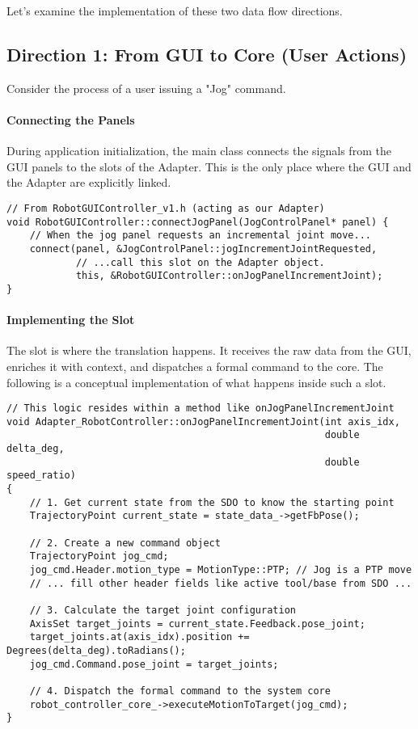 Let's examine the implementation of these two data flow directions.

\subsection{Direction 1: From GUI to Core (User Actions)}
\label{subsec:gui_to_core}

Consider the process of a user issuing a "Jog" command.

\paragraph{Connecting the Panels}
During application initialization, the main class connects the signals from the GUI panels to the slots of the Adapter. This is the only place where the GUI and the Adapter are explicitly linked.

\begin{verbatim}
// From RobotGUIController_v1.h (acting as our Adapter)
void RobotGUIController::connectJogPanel(JogControlPanel* panel) {
    // When the jog panel requests an incremental joint move...
    connect(panel, &JogControlPanel::jogIncrementJointRequested,
            // ...call this slot on the Adapter object.
            this, &RobotGUIController::onJogPanelIncrementJoint);
}
\end{verbatim}
\label{lst:adapter-connect}

\paragraph{Implementing the Slot}
The slot is where the translation happens. It receives the raw data from the GUI, enriches it with context, and dispatches a formal command to the core. The following is a conceptual implementation of what happens inside such a slot.

\begin{verbatim}
// This logic resides within a method like onJogPanelIncrementJoint
void Adapter_RobotController::onJogPanelIncrementJoint(int axis_idx, 
                                                       double delta_deg, 
                                                       double speed_ratio) 
{
    // 1. Get current state from the SDO to know the starting point
    TrajectoryPoint current_state = state_data_->getFbPose();

    // 2. Create a new command object
    TrajectoryPoint jog_cmd;
    jog_cmd.Header.motion_type = MotionType::PTP; // Jog is a PTP move
    // ... fill other header fields like active tool/base from SDO ...

    // 3. Calculate the target joint configuration
    AxisSet target_joints = current_state.Feedback.pose_joint;
    target_joints.at(axis_idx).position += Degrees(delta_deg).toRadians();
    jog_cmd.Command.pose_joint = target_joints;
    
    // 4. Dispatch the formal command to the system core
    robot_controller_core_->executeMotionToTarget(jog_cmd);
}
\end{verbatim}
\label{lst:adapter-slot-impl}

